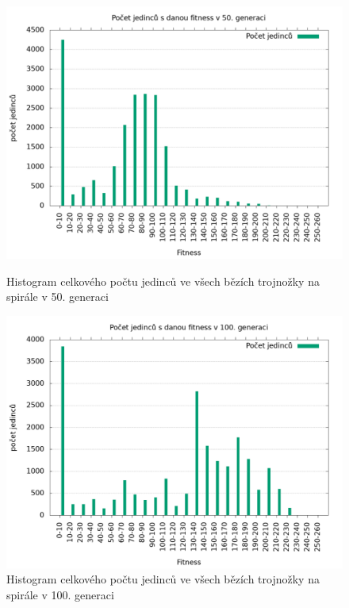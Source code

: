 \begin{figure}[h]
    \begin{minipage}[c]{0.48\linewidth}
        \includegraphics[width=\linewidth]{obrazky/trojnozka_spirala_fitnessHistogram50.png}
        \caption{Histogram celkového počtu jedinců ve všech bězích trojnožky na spirále v 50. generaci}
        \label{fig:trojnozka_spirala_histogram_50}
    \end{minipage}
    \hfill
    \begin{minipage}[c]{0.48\linewidth}
        \includegraphics[width=\linewidth]{obrazky/trojnozka_spirala_fitnessHistogram100.png}
        \caption{Histogram celkového počtu jedinců ve všech bězích trojnožky na spirále v 100. generaci}
        \label{fig:trojnozka_spirala_histogram_100}
    \end{minipage}
\end{figure}

